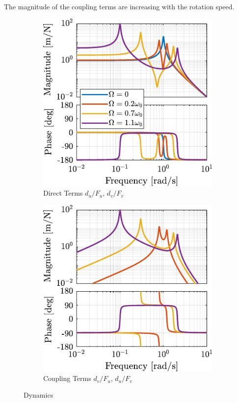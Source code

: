 \documentclass{ISMA_USD2020}
\begin{document}
The magnitude of the coupling terms are increasing with the rotation speed.

\begin{figure}[htbp]
\begin{subfigure}[c]{0.45\linewidth}
\includegraphics[width=\linewidth]{figs/plant_compare_rotating_speed_direct.pdf}
\caption{\label{fig:plant_compare_rotating_speed_direct} Direct Terms \(d_u/F_u\), \(d_v/F_v\)}
\end{subfigure}
\begin{subfigure}[c]{0.45\linewidth}
\includegraphics[width=\linewidth]{figs/plant_compare_rotating_speed_coupling.pdf}
\caption{\label{fig:plant_compare_rotating_speed_coupling} Coupling Terms \(d_v/F_u\), \(d_u/F_v\)}
\end{subfigure}
\caption{\label{fig:plant_compare_rotating_speed}Dynamics}
\centering
\end{figure}
\end{document}
